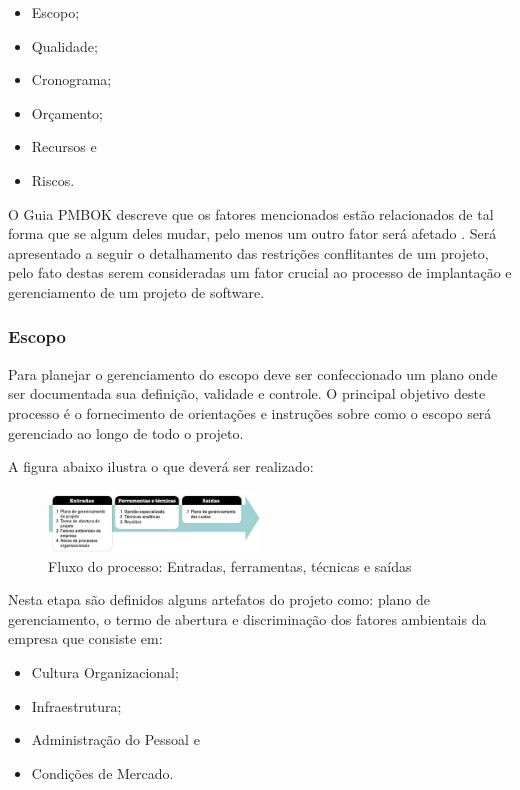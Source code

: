 \documentclass{acm_proc_article-sp}
\begin{document}
\begin{itemize}
\item Escopo;
\item Qualidade;
\item Cronograma;
\item Orçamento;
\item Recursos e 
\item Riscos.
\end{itemize}

O Guia PMBOK descreve que os fatores mencionados estão relacionados de tal forma que se algum deles mudar, pelo menos um outro fator será afetado \cite{pmbok:nAgil}. Será apresentado a seguir o detalhamento das restrições conflitantes de um projeto, pelo fato destas serem consideradas um fator crucial ao processo de implantação e gerenciamento de um projeto de software.  

\subsubsection*{Escopo}
Para planejar o gerenciamento do escopo deve ser confeccionado um plano onde ser documentada sua definição, validade e controle. O principal objetivo deste processo é o fornecimento de orientações e instruções sobre como o escopo será gerenciado ao longo de todo o projeto.

A figura abaixo ilustra o que deverá ser realizado:

\begin{figure}[h]
\centering %
\includegraphics[width=0.5\textwidth]{entradaescopo.jpg} %
\caption{Fluxo do processo: Entradas, ferramentas, técnicas e saídas \cite{pmbok:nAgil}}
\end{figure}

Nesta etapa são definidos alguns artefatos do projeto como: plano de gerenciamento, o termo de abertura e discriminação dos fatores ambientais da empresa que consiste em:

\begin{itemize}
\item Cultura Organizacional;
\item Infraestrutura;
\item Administração do Pessoal e
\item Condições de Mercado.
\end{itemize} 
\end{document}
